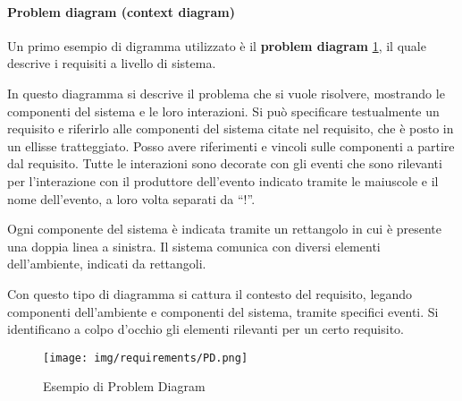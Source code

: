 \paragraph{Problem diagram (context diagram)}
Un primo esempio di digramma utilizzato è il \textbf{problem diagram}
\ref{fig:problemDiagram}, il quale descrive i requisiti a livello di sistema.

In questo diagramma si descrive il problema che si vuole risolvere, mostrando le
componenti del sistema e le loro interazioni. Si può specificare testualmente un
requisito e riferirlo alle componenti del sistema citate nel requisito, che è
posto in un ellisse tratteggiato. Posso avere riferimenti e vincoli sulle
componenti a partire dal requisito. Tutte le interazioni sono decorate con gli
eventi che sono rilevanti per l'interazione con il produttore dell'evento indicato
tramite le maiuscole e il nome dell'evento, a loro volta separati da “!”.

Ogni componente del sistema è indicata tramite un rettangolo in cui è presente
una doppia linea a sinistra. Il sistema comunica con diversi elementi
dell'ambiente, indicati da rettangoli.

Con questo tipo di diagramma si cattura il contesto del requisito, legando
componenti dell'ambiente e componenti del sistema, tramite specifici eventi.
Si identificano a colpo d'occhio gli elementi rilevanti per un certo requisito.

\begin{figure}[!ht]
      \centering
      \texttt{[image: img/requirements/PD.png]}
      \caption{Esempio di Problem Diagram}
      \label{fig:problemDiagram}
\end{figure}

